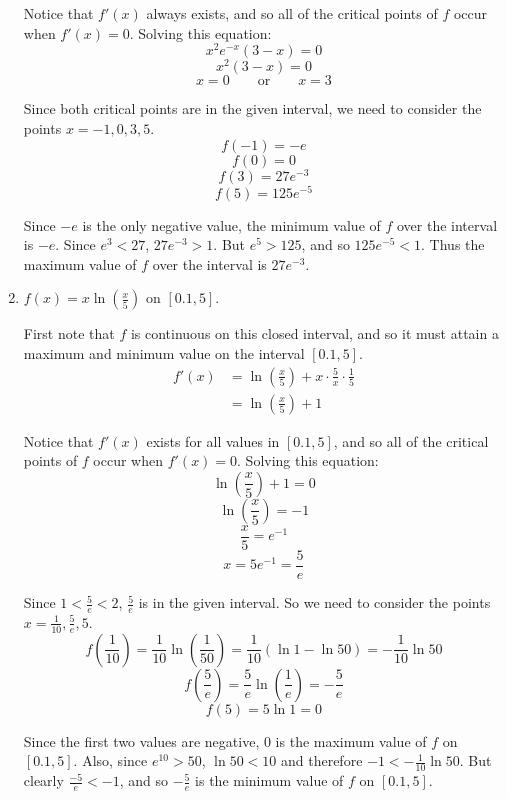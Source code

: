 \documentclass[nooutcomes]{ximera}
\begin{document}
\begin{problem}
\begin{enumerate}
\begin{freeResponse}
				Notice that $f'(x)$ always exists, and so all of the critical points of $f$ occur when $f'(x)=0$.  Solving this equation:
				$$ x^2 e^{-x} (3-x) = 0 $$
				$$ x^2 (3-x) = 0 $$
				$$ x = 0 \qquad \text{or} \qquad x=3 $$
				
				Since both critical points are in the given interval, we need to consider the points $x=-1,0,3,5$.
				$$ f(-1) = -e $$
				$$ f(0) = 0 $$
				$$ f(3) = 27e^{-3} $$
				$$ f(5) = 125 e^{-5} $$
				
				Since $-e$ is the only negative value, the minimum value of $f$ over the interval is $-e$.  Since $e^3 < 27$, $27e^{-3} > 1$.  But $e^5 > 125$, and so $125e^{-5} < 1$.  Thus the maximum value of $f$ over the interval is $27e^{-3}$.  
		
				\end{freeResponse}
				
				
				
			\item  $f(x) = x \ln \left( \frac{x}{5} \right)$ on $[0.1, 5]$.
			
				\begin{freeResponse}
				First note that $f$ is continuous on this closed interval, and so it must attain a maximum and minimum value on the interval $[0.1,5]$.
				\begin{align*}
				f'(x) &= \ln \left( \frac{x}{5} \right) + x \cdot \frac{5}{x} \cdot \frac{1}{5} \\
				&= \ln \left( \frac{x}{5} \right) + 1
				\end{align*}
				
				Notice that $f'(x)$ exists for all values in $[0.1,5]$, and so all of the critical points of $f$ occur when $f'(x)=0$.  Solving this equation:
				$$ \ln \left( \frac{x}{5} \right) + 1 = 0 $$
				$$ \ln \left( \frac{x}{5} \right) = -1 $$
				$$ \frac{x}{5} = e^{-1} $$
				$$ x = 5e^{-1} = \frac{5}{e} $$
				
				Since $1 < \frac{5}{e} < 2$, $\frac{5}{e}$ is in the given interval.  So we need to consider the points $x = \frac{1}{10}, \frac{5}{e}, 5$.
				$$ f \left( \frac{1}{10} \right) = \frac{1}{10} \ln \left( \frac{1}{50} \right)  = \frac{1}{10} \left( \ln 1 - \ln 50 \right) = -\frac{1}{10} \ln 50 $$
				$$ f \left( \frac{5}{e} \right) = \frac{5}{e} \ln \left( \frac{1}{e} \right) = - \frac{5}{e} $$
				$$ f(5) = 5 \ln 1 = 0 $$
				
				Since the first two values are negative, $0$ is the maximum value of $f$ on $[0.1,5]$.  Also, since $e^{10} > 50$, $\ln 50 < 10$ and therefore $-1 < -\frac{1}{10} \ln 50$.  But clearly $\frac{-5}{e} < -1$, and so $- \frac{5}{e}$ is the minimum value of $f$ on $[0.1, 5]$.  
				
				
		
				\end{freeResponse}
				
				
				
			\end{enumerate}

		
		
		

\end{problem}
	
\end{document}
